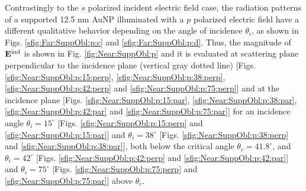 {Contrastingly to the $s$ polarized incident electric field case, the radiation patterns of a supported 12.5 nm AuNP illuminated with a $p$ polarized electric field have a different qualitative behavior depending on the angle of incidence $\theta_i$, as shown in Figs. \ref{sfig:Far:SuppObl:p:c} and  \ref{sfig:Far:SuppObl:p:d}. Thus, the magnitude of $\vb{E}^\text{ind}$ is shown in Fig. \ref{fig:Near:SuppObl:p} and it is evaluated at scattering plane perpendicular to the incidence plane (vertical gray dotted line) [Figs. \ref{sfig:Near:SuppObl:p:15:perp}, \ref{sfig:Near:SuppObl:p:38:perp}, \ref{sfig:Near:SuppObl:p:42:perp} and \ref{sfig:Near:SuppObl:p:75:perp}] and at the incidence  plane [Figs. \ref{sfig:Near:SuppObl:p:15:par}, \ref{sfig:Near:SuppObl:p:38:par}, \ref{sfig:Near:SuppObl:p:42:par} and \ref{sfig:Near:SuppObl:p:75:par}] for an incidence angle $\theta_i = 15^\circ$ [Figs. \ref{sfig:Near:SuppObl:p:15:perp}  and \ref{sfig:Near:SuppObl:p:15:par}] and  $\theta_i = 38^\circ$ [Figs. \ref{sfig:Near:SuppObl:p:38:perp}  and \ref{sfig:Near:SuppObl:p:38:par}], both below the critical angle $\theta_c = 41.8^\circ$, and $\theta_i = 42^\circ$ [Figs. \ref{sfig:Near:SuppObl:p:42:perp}  and \ref{sfig:Near:SuppObl:p:42:par}] and  $\theta_i = 75^\circ$ [Figs. \ref{sfig:Near:SuppObl:p:75:perp}  and \ref{sfig:Near:SuppObl:p:75:par}] above $\theta_c$.

}
